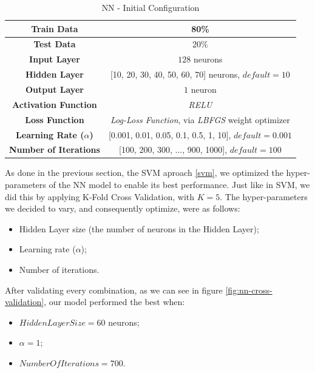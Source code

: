 \begin{table}[htbp]
\centering
\caption{NN - Initial Configuration}
\begin{tabular}{ |c|c| } 
 \hline
 \textbf{Train Data} & 80\% \\ 
 \hline
 \textbf{Test Data} & 20\% \\ 
 \hline
 \textbf{Input Layer} & \(128\) neurons \\ 
 \hline
 \textbf{Hidden Layer} & [10, 20, 30, 40, 50, 60, 70] neurons, \(default = 10\) \\ 
 \hline
 \textbf{Output Layer} & \(1\) neuron \\ 
 \hline
 \textbf{Activation Function} & \textit{RELU} \\ 
 \hline
 \textbf{Loss Function} & \textit{Log-Loss Function}, via \textit{LBFGS} weight optimizer \\ 
 \hline
 \textbf{Learning Rate (\(\alpha\))} & [0.001, 0.01, 0.05, 0.1, 0.5, 1, 10], \(default = 0.001\) \\ 
 \hline
 \textbf{Number of Iterations} & [100, 200, 300, ..., 900, 1000], \(default = 100\) \\ 
 \hline
\end{tabular}
\label{table:nn-initial-configuration}
\end{table}

As done in the previous section, the SVM aproach \ref{svm}, we optimized the hyper-parameters of the NN model to enable its best performance. Just like in SVM, we did this by applying K-Fold Cross Validation, with \(K = 5\). The hyper-parameters we decided to vary, and consequently optimize, were as follows:

\begin{itemize} 
\item Hidden Layer size (the number of neurons in the Hidden Layer);
\item Learning rate (\(\alpha\));
\item Number of iterations.
\end{itemize}

After validating every combination, as we can see in figure \ref{fig:nn-cross-validation}, our model performed the best when:

\begin{itemize} 
\item \( HiddenLayerSize = 60 \) neurons;
\item \( \alpha = 1 \);
\item \( NumberOfIterations = 700 \).
\end{itemize}

